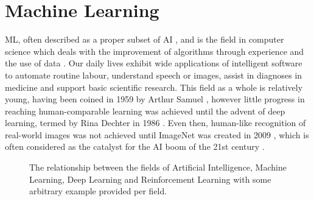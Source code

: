 \chapter{Machine Learning\label{chap:ML}}


\Gls{ML}, often described as a proper subset of \gls{AI}
\cite{Goodfellow-et-al-2016}, and is the field in computer science which deals
with the improvement of algorithms through experience and the use of data
\cite{Mitchell97}. Our daily lives exhibit wide applications of intelligent
software to automate routine labour, understand speech or images, assist in
diagnoses in medicine and support basic scientific research. This field as a
whole is relatively young, having been coined in 1959 by Arthur Samuel
\cite{5392560}, however little progress in reaching human-comparable learning
was achieved until the advent of deep learning, termed by Rina Dechter in 1986
\cite{Rina1986}. Even then, human-like recognition of real-world images was not
achieved until ImageNet was created in 2009 \cite{5206848}, which is often
considered as the catalyst for the AI boom of the 21st century
\cite{hardy_2016}.

\begin{figure}[htp!]
    \centering
    
    \captionsetup{format=hang} %
    \caption{
        The relationship between the fields of Artificial Intelligence,
        Machine Learning, Deep Learning and Reinforcement Learning with some
        arbitrary example provided per field.
    }
    \label{fig:al-ml-dl}
\end{figure}


